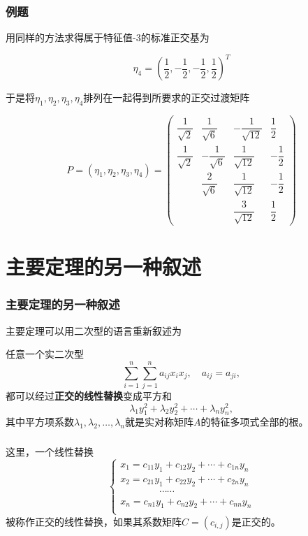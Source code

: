\begin{frame}
\frametitle{例题}

用同样的方法求得属于特征值-3的标准正交基为

$$\eta_4 = \left( \dfrac{1}{2}, -\dfrac{1}{2}, -\dfrac{1}{2}, \dfrac{1}{2} \right)^T$$

于是将$\eta_1, \eta_2, \eta_3, \eta_4$排列在一起得到所要求的正交过渡矩阵

$$P = (\eta_1, \eta_2, \eta_3, \eta_4) = \begin{pmatrix} \dfrac{1}{\sqrt{2}} & \dfrac{1}{\sqrt{6}} & -\dfrac{1}{\sqrt{12}} & \dfrac{1}{2} \\ \dfrac{1}{\sqrt{2}} & -\dfrac{1}{\sqrt{6}} & \dfrac{1}{\sqrt{12}} & -\dfrac{1}{2} \\ & \dfrac{2}{\sqrt{6}} & \dfrac{1}{\sqrt{12}} & -\dfrac{1}{2} \\ & & \dfrac{3}{\sqrt{12}} & \dfrac{1}{2} \end{pmatrix}$$

\end{frame}


\section{主要定理的另一种叙述}


\begin{frame}
\frametitle{主要定理的另一种叙述}

主要定理可以用二次型的语言重新叙述为

\begin{thm}
任意一个实二次型
$$\sum\limits_{i=1}^n \sum\limits_{j=1}^n a_{ij}x_ix_j, \quad a_{ij} = a_{ji},$$
都可以经过{\bfseries 正交的线性替换}变成平方和
$$\lambda_1 y_1^2 + \lambda_2 y_2^2 + \cdots + \lambda_n y_n^2,$$
其中平方项系数$\lambda_1,\lambda_2,\ldots,\lambda_n$就是实对称矩阵$A$的特征多项式全部的根。
\end{thm}

\end{frame}


\begin{frame}
\frametitle{}

这里，一个线性替换
$$
\begin{cases}
x_1 = c_{11}y_1 + c_{12}y_2 + \cdots + c_{1n}y_n \\
x_2 = c_{21}y_1 + c_{22}y_2 + \cdots + c_{2n}y_n \\
\hspace{4em} \cdots\cdots \\
x_n = c_{n1}y_1 + c_{n2}y_2 + \cdots + c_{nn}y_n \\
\end{cases}
$$
被称作正交的线性替换，如果其系数矩阵$C = (c_{i,j})$是正交的。

\end{frame}

